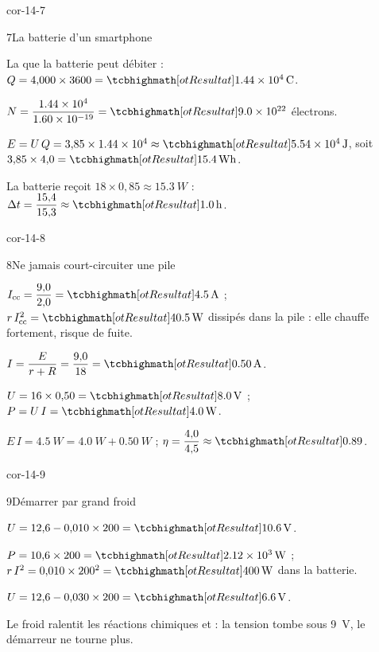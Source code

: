 \begin{blocLivre}{cor-14-7}
\begin{corrige}{7}{La batterie d'un smartphone}
\begin{questions}
\item La  que la batterie peut débiter : $Q=4{,}000\times3600=\res{\qty{1,44e4}{C}}$.
\item $N=\dfrac{\num{1,44e4}}{\num{1,60e-19}}=\res{\num{9,0e22}}$ électrons.
\item $E=U\,Q=3{,}85\times\num{1,44e4}\approx\res{\qty{5,54e4}{J}}$, soit $3{,}85\times4{,}0=\res{\qty{15,4}{Wh}}$.
\item La batterie reçoit $18\times0{,}85\approx\qty{15,3}{W}$ : $\Delta t=\dfrac{15{,}4}{15{,}3}\approx\res{\qty{1,0}{h}}$.
\end{questions}
\end{corrige}
\end{blocLivre}
\begin{blocLivre}{cor-14-8}
\begin{corrige}{8}{Ne jamais court-circuiter une pile}
\begin{questions}
\item $I_\mathrm{cc}=\dfrac{9{,}0}{2{,}0}=\res{\qty{4,5}{A}}$ ; $r\,I_\mathrm{cc}^2=\res{\qty{40,5}{W}}$ dissipés dans la pile : elle chauffe fortement, risque de fuite.
\item $I=\dfrac{E}{r+R}=\dfrac{9{,}0}{18}=\res{\qty{0,50}{A}}$.
\item $U=16\times0{,}50=\res{\qty{8,0}{V}}$ ; $P=U\,I=\res{\qty{4,0}{W}}$.
\item $E\,I=\qty{4,5}{W}=\qty{4,0}{W}+\qty{0,50}{W}$ ; $\eta=\dfrac{4{,}0}{4{,}5}\approx\res{\num{0,89}}$.
\end{questions}
\end{corrige}
\end{blocLivre}
\begin{blocLivre}{cor-14-9}
\begin{corrige}{9}{Démarrer par grand froid}
\begin{questions}
\item $U=12{,}6-0{,}010\times200=\res{\qty{10,6}{V}}$.
\item $P=10{,}6\times200=\res{\qty{2,12e3}{W}}$ ; $r\,I^2=0{,}010\times200^2=\res{\qty{400}{W}}$ dans la batterie.
\item $U=12{,}6-0{,}030\times200=\res{\qty{6,6}{V}}$.
\item Le froid ralentit les réactions chimiques et  : la tension tombe sous \qty{9}{V}, le démarreur ne tourne plus.
\end{questions}
\end{corrige}
\end{blocLivre}
